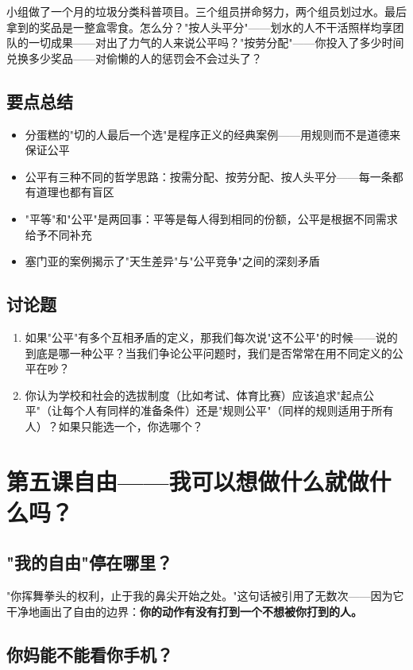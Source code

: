 \documentclass[a4paper,12pt]{ctexart}
\begin{document}
小组做了一个月的垃圾分类科普项目。三个组员拼命努力，两个组员划过水。最后拿到的奖品是一整盒零食。怎么分？"按人头平分"——划水的人不干活照样均享团队的一切成果——对出了力气的人来说公平吗？"按劳分配"——你投入了多少时间兑换多少奖品——对偷懒的人的惩罚会不会过头了？

\subsection*{要点总结}
\begin{itemize}
  \item 分蛋糕的"切的人最后一个选"是程序正义的经典案例——用规则而不是道德来保证公平
  \item 公平有三种不同的哲学思路：按需分配、按劳分配、按人头平分——每一条都有道理也都有盲区
  \item "平等"和"公平"是两回事：平等是每人得到相同的份额，公平是根据不同需求给予不同补充
  \item 塞门亚的案例揭示了"天生差异"与"公平竞争"之间的深刻矛盾
\end{itemize}

\subsection*{讨论题}
\begin{enumerate}
  \item 如果"公平"有多个互相矛盾的定义，那我们每次说"这不公平"的时候——说的到底是哪一种公平？当我们争论公平问题时，我们是否常常在用不同定义的公平在吵？
  \item 你认为学校和社会的选拔制度（比如考试、体育比赛）应该追求"起点公平"（让每个人有同样的准备条件）还是"规则公平"（同样的规则适用于所有人）？如果只能选一个，你选哪个？
\end{enumerate}

\newpage
\section{\textcolor{orange!80!black}{第五课\quad 自由——我可以想做什么就做什么吗？}}

\subsection*{"我的自由"停在哪里？}

"你挥舞拳头的权利，止于我的鼻尖开始之处。"这句话被引用了无数次——因为它干净地画出了自由的边界：\textbf{你的动作有没有打到一个不想被你打到的人。}

\subsection*{你妈能不能看你手机？}
\end{document}

